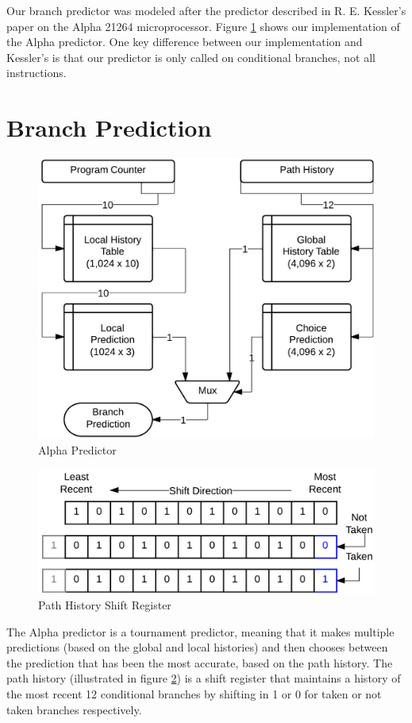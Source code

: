 \documentclass[twocolumn]{article}
\newcommand{\centerimage}[3]{
\begin{figure}[ht!]  
\begin{center} #1
\caption{#2}
\label{#3}
\end{center}
\end{figure}}
\begin{document}
Our branch predictor was modeled after the predictor described in R. E. Kessler's paper on the Alpha 21264 microprocessor.  Figure \ref{alpha} shows our implementation of the Alpha predictor.  One key difference between our implementation and Kessler's is that our predictor is only called on conditional branches, not all instructions.\\\section{Branch Prediction}\centerimage{\includegraphics[width=\columnwidth]{alpha.png}}{Alpha Predictor}{alpha}\centerimage{\includegraphics[width=\columnwidth]{phistory.png}}{Path History Shift Register}{phistory}
The Alpha predictor is a tournament predictor, meaning that it makes multiple predictions (based on the global and local histories) and then chooses between the prediction that has  been the most accurate, based on the path history.  The path history (illustrated in figure \ref{phistory}) is a shift register that maintains a history of the most recent 12 conditional branches by shifting in 1 or 0 for taken or not taken branches respectively.\\\\
\end{document}
